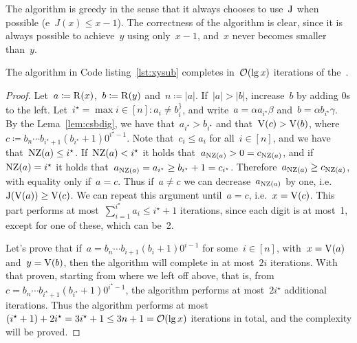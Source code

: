 \documentclass[main.tex]{subfiles}
\begin{document}
The algorithm is greedy in the sense that it always chooses to use~$\operatorname{J}$ when possible (e~${J(x) \leq x - 1}$). The correctness of the algorithm is clear, since it is always possible to achieve~$y$ using only~$x-1$, and~$x$ never becomes smaller than~$y$.

\begin{theorem} \label{thm:xysub}
    The algorithm in Code listing~\ref{lst:xysub} completes in~$\mathcal{O}(\lg x)$ iterations of the~.
\end{theorem}
\begin{proof}

	Let~$a \coloneqq \operatorname{R}(x)$,~$b \coloneqq \operatorname{R}(y)$ and~$n \coloneqq |a|$. If~$|a| > |b|$, increase~$b$ by adding 0s to the left. Let~${i^\star = \max{i \in [n] : a_i \neq b_i^\}}}$, and write~${a = \alpha a_{i^\star} \beta}$ and~${b = \alpha b_{i^\star} \gamma}$. By the Lema~\ref{lem:csbdig}, we have that~$a_{i^\star} > b_{i^\star}$ and that~${\operatorname{V}(c) > \operatorname{V}(b)}$, where~${c \coloneqq b_n \cdots b_{i^\star + 1} (b_{i^\star} + 1) 0^{i^\star - 1}}$. Note that~$c_i \leq a_i$ for all~${i \in [n]}$, and we have that~${\operatorname{NZ}(a) \leq i^\star}$. If~${\operatorname{NZ}(a) < i^\star}$ it holds that~$a_{\operatorname{NZ}(a)} > 0 = c_{\operatorname{NZ}(a)}$, and if~$\operatorname{NZ}(a) = i^\star$ it holds that~${a_{\operatorname{NZ}(a)} = a_{i^\star} \geq b_{i^\star} + 1 = c_{i^\star}}$. Therefore~$a_{\operatorname{NZ}(a)} \geq c_{\operatorname{NZ}(a)}$, with equality only if~$a = c$. Thus if~$a \neq c$ we can decrease~$a_{\operatorname{NZ}(a)}$ by one, i.e.~$\operatorname{J}(\operatorname{V}(a)) \geq \operatorname{V}(c)$. We can repeat this argument until~$a = c$, i.e.~$x = \operatorname{V}(c)$. This part performs at most~${\sum\limits_{i = 1}^{i^\star}{a_i} \leq i^\star + 1}$ iterations, since each digit is at most~1, except for one of these, which can be~2.

	Let's prove that if~${a = b_n \cdots b_{i+1} (b_i + 1) 0^{i-1}}$ for some~$i \in [n]$, with~${x = \operatorname{V}(a)}$ and~${y = \operatorname{V}(b)}$, then the algorithm will complete in at most~$2i$ iterations. With that proven, starting from where we left off above, that is, from~${c = b_n \cdots b_{i^\star + 1} (b_{i^\star} + 1) 0^{i^\star - 1}}$, the algorithm performs at most~$2i^\star$ additional iterations. Thus the algorithm performs at most~${(i^\star + 1) + 2i^\star = 3i^\star + 1 \leq 3n+1 = \mathcal{O}(\lg x)}$ iterations in total, and the complexity will be proved.


\end{proof}
\end{document}
